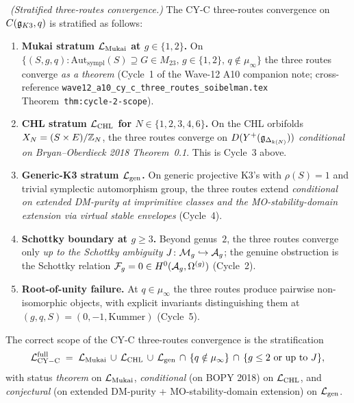 \begin{theorem}
\label{wn:thm:wave15-a10-CYC-stratification}
\ClaimStatusTheorem\ \emph{(Stratified three-routes convergence.)}
The CY-C three-routes convergence on $C(\mathfrak{g}_{K3}, q)$ is stratified
as follows:
\begin{enumerate}[label=\textup{(\textbf{S\arabic*})}]
\item \textbf{Mukai stratum $\mathcal{L}_{\mathrm{Mukai}}$ at $g \in \{1, 2\}$.}
On $\{(S, g, q) : \mathrm{Aut}_{\mathrm{sympl}}(S) \supseteq G \in
M_{23},\, g \in \{1, 2\},\, q \notin \mu_\infty\}$ the three routes
converge \emph{as a theorem} (Cycle~1 of the Wave-12 A10 companion
note; cross-reference
\texttt{wave12\_a10\_cy\_c\_three\_routes\_soibelman.tex}
Theorem~\texttt{thm:cycle-2-scope}).
\item \textbf{CHL stratum $\mathcal{L}_{\mathrm{CHL}}$ for $N \in \{1, 2, 3,
4, 6\}$.} On the CHL orbifolds $X_N = (S \times E)/\mathbb{Z}_N$, the three
routes converge on $D(Y^{+}(\mathfrak{g}_{\Delta_{k(N)}}))$ \emph{conditional
on Bryan--Oberdieck 2018 Theorem~0.1}. This is Cycle~3 above.
\item \textbf{Generic-K3 stratum $\mathcal{L}_{\mathrm{gen}}$.} On generic
projective K$3$'s with $\rho(S) = 1$ and trivial symplectic
automorphism group, the three routes extend \emph{conditional on
extended DM-purity at imprimitive classes and the MO-stability-domain
extension via virtual stable envelopes} (Cycle~4).
\item \textbf{Schottky boundary at $g \geq 3$.} Beyond genus~$2$, the
three routes converge only \emph{up to the Schottky ambiguity}
$J \colon \mathcal{M}_g \hookrightarrow \mathcal{A}_g$; the genuine obstruction is
the Schottky relation $\mathcal{F}_g = 0 \in H^0(\mathcal{A}_g, \Omega^{(g)})$
(Cycle~2).
\item \textbf{Root-of-unity failure.} At $q \in \mu_\infty$ the three
routes produce pairwise non-isomorphic objects, with explicit
invariants distinguishing them at $(g, q, S) = (0, -1, \mathrm{Kummer})$
(Cycle~5).
\end{enumerate}
The correct scope of the CY-C three-routes convergence is the
stratification
\[
  \mathcal{L}_{\mathrm{CY-C}}^{\mathrm{full}}
  \;=\; \mathcal{L}_{\mathrm{Mukai}} \,\cup\, \mathcal{L}_{\mathrm{CHL}} \,\cup\,
  \mathcal{L}_{\mathrm{gen}} \,\cap\, \{q \notin \mu_\infty\} \,\cap\,
  \{g \leq 2 \text{ or up to } J\},
\]
with status \emph{theorem} on $\mathcal{L}_{\mathrm{Mukai}}$,
\emph{conditional} (on BOPY 2018) on $\mathcal{L}_{\mathrm{CHL}}$, and
\emph{conjectural} (on extended DM-purity + MO-stability-domain
extension) on $\mathcal{L}_{\mathrm{gen}}$.
\end{theorem}

